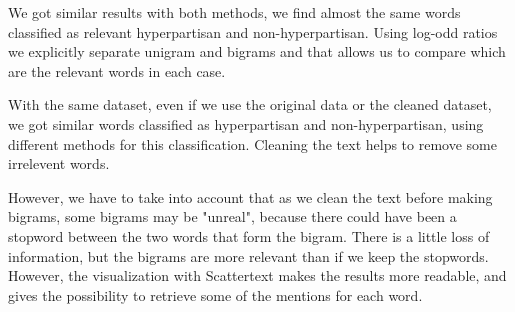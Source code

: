 \documentclass[11pt,a4paper]{article}
\begin{document}
We got similar results with both methods, we find almost the same words classified as relevant hyperpartisan and non-hyperpartisan. Using log-odd ratios we explicitly separate unigram and bigrams and that allows us to compare which are the relevant words in each case. 

With the same dataset, even if we use the original data or the cleaned dataset, we got similar words classified as hyperpartisan and non-hyperpartisan, using different methods for this classification. Cleaning the text helps to remove some irrelevent words. 

However, we have to take into account that as we clean the text before making bigrams, some bigrams may be "unreal", because there could have been a stopword between the two words that form the bigram. There is a little loss of information, but the bigrams are more relevant than if we keep the stopwords. However, the visualization with Scattertext makes the results more readable, and gives the possibility to retrieve some of the mentions for each word.



\end{document}
